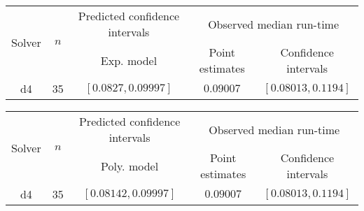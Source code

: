 \begin{tabular}{ccccc}
\hline 
\multirow{2}{*}{Solver} & \multirow{2}{*}{$n$} & Predicted confidence intervals & \multicolumn{2}{c}{Observed median  run-time}\tabularnewline
 &  & Exp. model  & Point estimates  & Confidence intervals\tabularnewline
\hline 
\hline 
\multirow{0}{*}{d4} & 35 & $\mathbf{\left[0.0827,0.09997\right]}$ & $0.09007$ & $\left[0.08013,0.1194\right]$ \tabularnewline 
\hline 
\end{tabular} 

\begin{tabular}{ccccc}
\hline 
\multirow{2}{*}{Solver} & \multirow{2}{*}{$n$} & Predicted confidence intervals & \multicolumn{2}{c}{Observed median  run-time}\tabularnewline
 &  & Poly. model  & Point estimates  & Confidence intervals\tabularnewline
\hline 
\hline 
\multirow{0}{*}{d4} & 35 & $\mathbf{\left[0.08142,0.09997\right]}$ & $0.09007$ & $\left[0.08013,0.1194\right]$ \tabularnewline 
\hline 
\end{tabular} 


